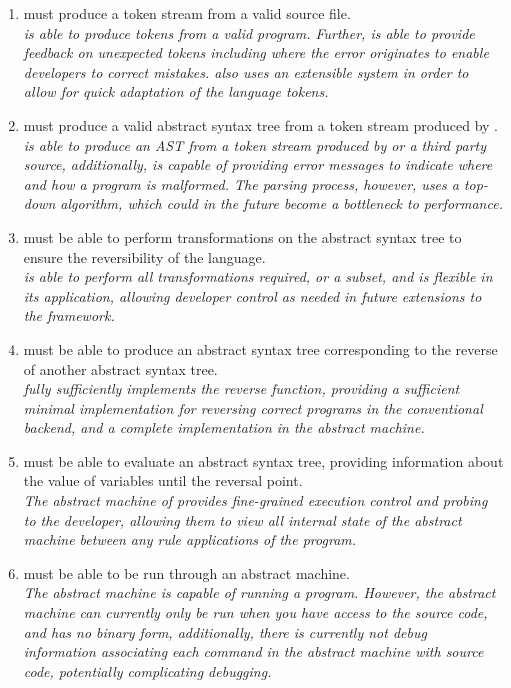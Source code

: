 \begin{enumerate}
    \item \rimp must produce a token stream from a valid \rimplang source file.\\
    \textit{\rimp is able to produce tokens from a valid \rimplang program. Further, \rimp is able to provide feedback on unexpected tokens including where the error originates to enable developers to correct mistakes. \rimp also uses an extensible system in order to allow for quick adaptation of the language tokens.}
    \item \rimp must produce a valid abstract syntax tree from a token stream produced by \rimp. \\
    \textit{\rimp is able to produce an AST from a token stream produced by \rimp or a third party source, additionally, \rimp is capable of providing error messages to indicate where and how a program is malformed. The parsing process, however, uses a top-down algorithm, which could in the future become a bottleneck to performance.}
    \item \rimp must be able to perform transformations on the abstract syntax tree to ensure the reversibility of the language. \\
    \textit{\rimp is able to perform all transformations required, or a subset, and is flexible in its application, allowing developer control as needed in future extensions to the framework.}
    \item \rimp must be able to produce an abstract syntax tree corresponding to the reverse of another abstract syntax tree. \\
    \textit{\rimp fully sufficiently implements the reverse function, providing a sufficient minimal implementation for reversing correct \rimp programs in the conventional backend, and a complete implementation in the abstract machine.}
    \item \rimp must be able to evaluate an abstract syntax tree, providing information about the value of variables until the reversal point. \\
    \textit{The abstract machine of \rimp provides fine-grained execution control and probing to the developer, allowing them to view all internal state of the abstract machine between any rule applications of the program.}
    \item \rimp must be able to be run through an abstract machine. \\
    \textit{The \rimp abstract machine is capable of running a program. However, the abstract machine can currently only be run when you have access to the \rimplang source code, and has no binary form, additionally, there is currently not debug information associating each command in the abstract machine with source code, potentially complicating debugging.}

\end{enumerate}
